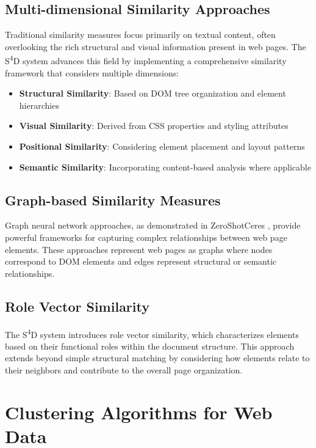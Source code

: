 \subsection{Multi-dimensional Similarity Approaches}

Traditional similarity measures focus primarily on textual content, often overlooking the rich structural and visual information present in web pages. The S\textsuperscript{4}D system advances this field by implementing a comprehensive similarity framework that considers multiple dimensions:

\begin{itemize}
    \item \textbf{Structural Similarity}: Based on DOM tree organization and element hierarchies
    \item \textbf{Visual Similarity}: Derived from CSS properties and styling attributes
    \item \textbf{Positional Similarity}: Considering element placement and layout patterns
    \item \textbf{Semantic Similarity}: Incorporating content-based analysis where applicable
\end{itemize}

\subsection{Graph-based Similarity Measures}

Graph neural network approaches, as demonstrated in ZeroShotCeres \cite{lockard2020zeroshotceres}, provide powerful frameworks for capturing complex relationships between web page elements. These approaches represent web pages as graphs where nodes correspond to DOM elements and edges represent structural or semantic relationships.

\subsection{Role Vector Similarity}

The S\textsuperscript{4}D system introduces role vector similarity, which characterizes elements based on their functional roles within the document structure. This approach extends beyond simple structural matching by considering how elements relate to their neighbors and contribute to the overall page organization.

\section{Clustering Algorithms for Web Data}
\label{sec:clustering-algorithms}

